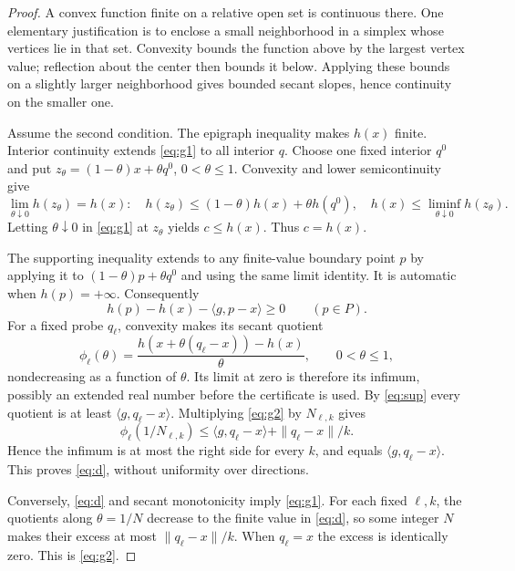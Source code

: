 \documentclass[11pt,a4paper]{article}
\begin{document}
\begin{proof}
A convex function finite on a relative open set is continuous there.
One elementary justification is to enclose a small neighborhood in a simplex
whose vertices lie in that set. Convexity bounds the function above by the
largest vertex value; reflection about the center then bounds it below.
Applying these bounds on a slightly larger neighborhood gives bounded secant
slopes, hence continuity on the smaller one.

Assume the second condition. The epigraph inequality makes \(h(x)\) finite.
Interior continuity extends \eqref{eq:g1} to all interior \(q\). Choose one fixed
interior \(q^0\) and put \(z_\theta=(1-\theta)x+\theta q^0\), \(0<\theta\le1\).
Convexity and lower semicontinuity give
\[
\lim_{\theta\downarrow0}h(z_\theta)=h(x):
\quad h(z_\theta)\le(1-\theta)h(x)+\theta h(q^0),
\quad h(x)\le\liminf_{\theta\downarrow0}h(z_\theta).
\]
Letting \(\theta\downarrow0\) in \eqref{eq:g1} at \(z_\theta\) yields \(c\le h(x)\).
Thus \(c=h(x)\).

The supporting inequality extends to any finite-value boundary point \(p\)
by applying it to \((1-\theta)p+\theta q^0\) and using the same limit identity.
It is automatic when \(h(p)=+\infty\). Consequently
\begin{equation}
h(p)-h(x)-\langle g,p-x\rangle\ge0\qquad(p\in P).
\label{eq:sup}
\end{equation}
For a fixed probe \(q_\ell\), convexity makes its secant quotient
\[
\phi_\ell(\theta)=\frac{h(x+\theta(q_\ell-x))-h(x)}{\theta},
\qquad 0<\theta\le1,
\]
nondecreasing as a function of \(\theta\). Its limit at zero is therefore its
infimum, possibly an extended real number before the certificate is used.
By \eqref{eq:sup} every quotient is at least \(\langle g,q_\ell-x\rangle\).
Multiplying \eqref{eq:g2} by \(N_{\ell,k}\) gives
\[
\phi_\ell(1/N_{\ell,k})
\le\langle g,q_\ell-x\rangle+\|q_\ell-x\|/k.
\]
Hence the infimum is at most the right side for every \(k\), and equals
\(\langle g,q_\ell-x\rangle\). This proves \eqref{eq:d}, without uniformity
over directions.

Conversely, \eqref{eq:d} and secant monotonicity imply \eqref{eq:g1}. For each fixed
\(\ell,k\), the quotients along \(\theta=1/N\) decrease to the finite value
in \eqref{eq:d}, so some integer \(N\) makes their excess at most
\(\|q_\ell-x\|/k\). When \(q_\ell=x\) the excess is identically zero.
This is \eqref{eq:g2}.
\end{proof}
\end{document}
